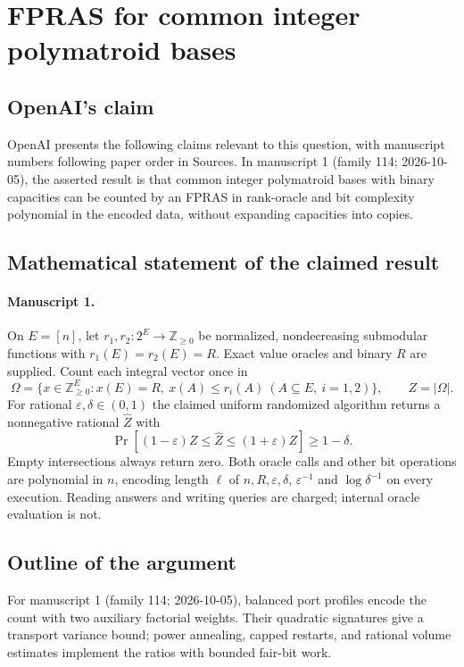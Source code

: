 \documentclass[11pt]{article}
\begin{document}
\section*{FPRAS for common integer polymatroid bases}

\subsection{OpenAI's claim}
OpenAI presents the following claims relevant to this question, with manuscript numbers following paper order in Sources. In manuscript 1 (family 114; 2026-10-05), the asserted result is that common integer polymatroid bases with binary capacities can be counted by an FPRAS in rank-oracle and bit complexity polynomial in the encoded data, without expanding capacities into copies.

\subsection{Mathematical statement of the claimed result}
\paragraph{Manuscript 1.}
On $E=[n]$, let $r_1,r_2:2^E\to\mathbb Z_{\ge0}$ be normalized, nondecreasing submodular functions with $r_1(E)=r_2(E)=R$. Exact value oracles and binary $R$ are supplied. Count each integral vector once in
\[
 \Omega=\{x\in\mathbb Z_{\ge0}^E:x(E)=R,\ x(A)\le r_i(A)\ (A\subseteq E,\ i=1,2)\},\qquad Z=|\Omega|.
\]
For rational $\varepsilon,\delta\in(0,1)$ the claimed uniform randomized algorithm returns a nonnegative rational $\widehat Z$ with
\[
 \Pr[(1-\varepsilon)Z\le\widehat Z\le(1+\varepsilon)Z]\ge1-\delta.
\]
Empty intersections always return zero. Both oracle calls and other bit operations are polynomial in $n$, encoding length $\ell$ of $n,R,\varepsilon,\delta$, $\varepsilon^{-1}$ and $\log\delta^{-1}$ on every execution. Reading answers and writing queries are charged; internal oracle evaluation is not.

\subsection{Outline of the argument}
For manuscript 1 (family 114; 2026-10-05), balanced port profiles encode the count with two auxiliary factorial weights. Their quadratic signatures give a transport variance bound; power annealing, capped restarts, and rational volume estimates implement the ratios with bounded fair-bit work.
\end{document}
